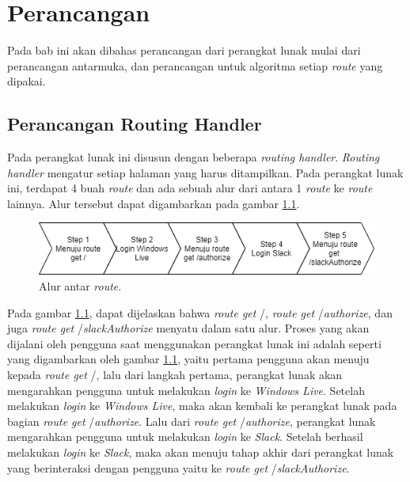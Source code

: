 \chapter{Perancangan}
\label{chap:perancangan}

Pada bab ini akan dibahas perancangan dari perangkat lunak mulai dari perancangan antarmuka, dan perancangan untuk algoritma setiap \textit{route} yang dipakai. 

\section{Perancangan Routing Handler}
Pada perangkat lunak ini disusun dengan beberapa \textit{routing handler}. \textit{Routing handler} mengatur setiap halaman yang harus ditampilkan. Pada perangkat lunak ini, terdapat 4 buah \textit{route} dan ada sebuah alur dari antara 1 \textit{route} ke \textit{route} lainnya. Alur tersebut dapat digambarkan pada gambar \ref{fig:alur_route}. 

\begin{figure}[h]
  \includegraphics[width=15cm]{./Gambar/flowPL.png}
  \centering
  \caption{Alur antar \textit{route}.}
  \label{fig:alur_route}
\end{figure}

Pada gambar \ref{fig:alur_route}, dapat dijelaskan bahwa \textit{route get} /, \textit{route get} /\textit{authorize}, dan juga \textit{route get} /\textit{slackAuthorize} menyatu dalam satu alur. Proses yang akan dijalani oleh pengguna saat menggunakan perangkat lunak ini adalah seperti yang digambarkan oleh gambar \ref{fig:alur_route}, yaitu pertama pengguna akan menuju kepada \textit{route get} /, lalu dari langkah pertama, perangkat lunak akan mengarahkan pengguna untuk melakukan \textit{login} ke \textit{Windows Live}. Setelah melakukan \textit{login} ke \textit{Windows Live}, maka akan kembali ke perangkat lunak pada bagian \textit{route get} /\textit{authorize}. Lalu dari \textit{route get} /\textit{authorize}, perangkat lunak mengarahkan pengguna untuk melakukan \textit{login} ke \textit{Slack}. Setelah berhasil melakukan \textit{login} ke \textit{Slack}, maka akan menuju tahap akhir dari perangkat lunak yang berinteraksi dengan pengguna yaitu ke \textit{route get} /\textit{slackAuthorize}. 

